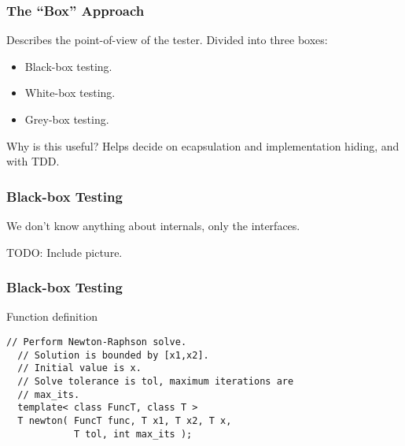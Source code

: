 \begin{frame}
\end{frame}

\begin{frame}
  \frametitle{The ``Box'' Approach}
  Describes the point-of-view of the tester.
  Divided into three boxes:
  \begin{itemize}
  \item Black-box testing.
  \item White-box testing.
  \item Grey-box testing.
  \end{itemize}
  Why is this useful? Helps decide on ecapsulation and
  implementation hiding, and with TDD.
\end{frame}

\begin{frame}
  \frametitle{Black-box Testing}
  We don't know anything about internals, only
  the interfaces.

  TODO: Include picture.
\end{frame}

\begin{frame}[fragile]
  \frametitle{Black-box Testing}
  \begin{block}{Function definition}
    \begin{lstlisting}[style=C]
  // Perform Newton-Raphson solve.
  // Solution is bounded by [x1,x2].
  // Initial value is x.
  // Solve tolerance is tol, maximum iterations are
  // max_its.
  template< class FuncT, class T >
  T newton( FuncT func, T x1, T x2, T x,
            T tol, int max_its );
    \end{lstlisting}
  \end{block}
\end{frame}

